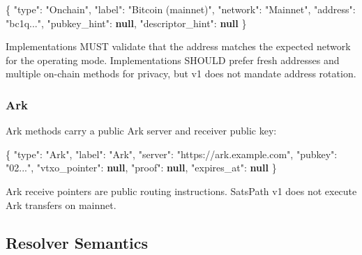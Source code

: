 \documentclass[
]{article}
\newenvironment{Shaded}{}{}
\newcommand{\DataTypeTok}[1]{\textcolor[rgb]{0.56,0.13,0.00}{#1}}
\newcommand{\FunctionTok}[1]{\textcolor[rgb]{0.02,0.16,0.49}{#1}}
\newcommand{\KeywordTok}[1]{\textcolor[rgb]{0.00,0.44,0.13}{\textbf{#1}}}
\newcommand{\StringTok}[1]{\textcolor[rgb]{0.25,0.44,0.63}{#1}}
\begin{document}
\begin{Shaded}
\begin{Highlighting}[]
\FunctionTok{\{}
  \DataTypeTok{"type"}\FunctionTok{:} \StringTok{"Onchain"}\FunctionTok{,}
  \DataTypeTok{"label"}\FunctionTok{:} \StringTok{"Bitcoin (mainnet)"}\FunctionTok{,}
  \DataTypeTok{"network"}\FunctionTok{:} \StringTok{"Mainnet"}\FunctionTok{,}
  \DataTypeTok{"address"}\FunctionTok{:} \StringTok{"bc1q..."}\FunctionTok{,}
  \DataTypeTok{"pubkey\_hint"}\FunctionTok{:} \KeywordTok{null}\FunctionTok{,}
  \DataTypeTok{"descriptor\_hint"}\FunctionTok{:} \KeywordTok{null}
\FunctionTok{\}}
\end{Highlighting}
\end{Shaded}

Implementations MUST validate that the address matches the expected
network for the operating mode. Implementations SHOULD prefer fresh
addresses and multiple on-chain methods for privacy, but v1 does not
mandate address rotation.

\hypertarget{ark}{%
\subsubsection{Ark}\label{ark}}

Ark methods carry a public Ark server and receiver public key:

\begin{Shaded}
\begin{Highlighting}[]
\FunctionTok{\{}
  \DataTypeTok{"type"}\FunctionTok{:} \StringTok{"Ark"}\FunctionTok{,}
  \DataTypeTok{"label"}\FunctionTok{:} \StringTok{"Ark"}\FunctionTok{,}
  \DataTypeTok{"server"}\FunctionTok{:} \StringTok{"https://ark.example.com"}\FunctionTok{,}
  \DataTypeTok{"pubkey"}\FunctionTok{:} \StringTok{"02..."}\FunctionTok{,}
  \DataTypeTok{"vtxo\_pointer"}\FunctionTok{:} \KeywordTok{null}\FunctionTok{,}
  \DataTypeTok{"proof"}\FunctionTok{:} \KeywordTok{null}\FunctionTok{,}
  \DataTypeTok{"expires\_at"}\FunctionTok{:} \KeywordTok{null}
\FunctionTok{\}}
\end{Highlighting}
\end{Shaded}

Ark receive pointers are public routing instructions. SatsPath v1 does
not execute Ark transfers on mainnet.

\hypertarget{resolver-semantics}{%
\subsection{Resolver Semantics}\label{resolver-semantics}}
\end{document}
